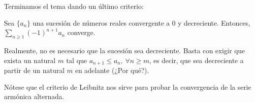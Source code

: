 Terminamos el tema dando un último criterio:
\begin{teo}
    Sea $\{a_n\}$ una sucesión de números reales convergente a $0$ y decreciente. Entonces, $\displaystyle\sum_{n \geq 1} (-1)^{n+1} a_n$ converge.
\end{teo}

Realmente, no es necesario que la sucesión sea decreciente. Basta con exigir que exista un natural $m$ tal que
$a_{n+1} \leq a_n, ~ \forall n \geq m$, es decir, que sea decreciente a partir de un natural $m$ en adelante (¿Por qué?).

Nótese que el criterio de Leibnitz nos sirve para probar la convergencia de la serie armónica alternada.